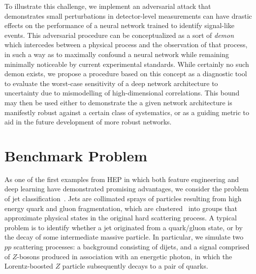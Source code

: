 \documentclass[reprint,nofootinbib,...]{revtex4-1}
\begin{document}

To illustrate this challenge, we implement an adversarial attack that demonstrates small perturbations in detector-level measurements can have drastic effects on the performance of a neural network trained to identify signal-like events.
This adversarial procedure can be conceptualized as a sort of \textit{demon}~\cite{TheLordKelvin} which intercedes between a physical process and the observation of that process, in such a way as to maximally confound a neural network while remaining minimally noticeable by current experimental standards.
While certainly no such demon exists, we propose a procedure based on this concept as a diagnostic tool to evaluate the worst-case sensitivity of a deep network architecture to uncertainty due to mismodelling of high-dimensional correlations.
This bound may then be used either to demonstrate the a given network architecture is manifestly robust against a certain class of systematics, or as a guiding metric to aid in the future development of more robust networks.

\section{Benchmark Problem}
\label{sec:benchmark}

As one of the first examples from HEP in which both feature engineering and deep learning have demonstrated promising advantages, we consider the problem of jet classification~\cite{Larkoski:2017jix}.
Jets are collimated sprays of particles resulting from high energy quark and gluon fragmentation, which are clustered~\cite{Cacciari:2008gp} into groups that approximate physical states in the original hard scattering process.
A typical problem is to identify whether a jet originated from a quark/gluon state, or by the decay of some intermediate massive particle.
In particular, we simulate two $pp$ scattering processes: a background consisting of dijets, and a signal comprised of $Z$-bosons produced in association with an energetic photon, in which the Lorentz-boosted $Z$ particle subsequently decays to a pair of quarks.
\end{document}
